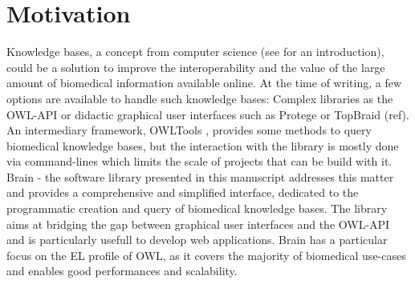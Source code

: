 \documentclass{bioinfo}
\begin{document}
\section{Motivation}
Knowledge bases, a concept from computer science (see \citealp{Krotzsch2012} for an introduction),
could be a solution to improve the interoperability and the value of the large amount of biomedical information available online.
At the time of writing, a few options are available to handle such knowledge bases: Complex
libraries as the OWL-API \citep{MatthewHorridge2011} or didactic graphical user interfaces such as
Protege \citep{StanfordCenterforBiomedicalInformaticsResearch} or TopBraid (ref). An intermediary framework,
OWLTools \citep{MungallC},
provides some methods to query biomedical knowledge bases, but the interaction with the library is mostly done via command-lines which
limits the scale of projects that can be build with it.
Brain - the software library presented in this manuscript addresses this matter and provides a comprehensive and simplified
interface, dedicated to the programmatic creation and query of biomedical knowledge bases. The library aims at bridging the gap between
graphical user interfaces and the OWL-API and is particularly usefull to develop web applications.
Brain has a particular focus on the EL profile of OWL, as it covers the majority of biomedical
use-cases and enables good performances and scalability. 
\end{document}
